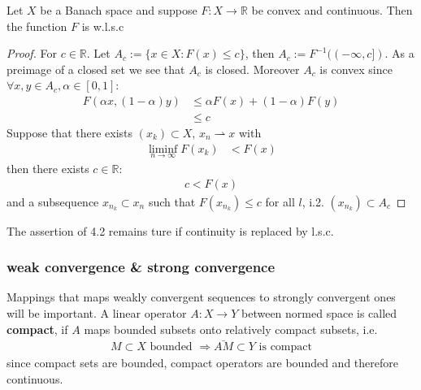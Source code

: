 \begin{theorem}
	Let $X$ be a Banach space and suppose $F: X \rightarrow \mathbb{R}$ be convex and continuous. Then the function $F$ is w.l.s.c
\end{theorem}
\begin{proof}
	For $c \in \mathbb{R}$. Let $A_c:= \{x \in X: F(x) \le c\}$, then $A_c:= F^{-1}((-\infty, c])$. As a preimage of a closed set we see that $A_c$ is closed. Moreover $A_c$ is convex since $\forall x, y \in A_c, \alpha \in [0, 1]:$
	\begin{align*}
		F(\alpha x, (1 - \alpha)y ) &\le \alpha F(x) + (1 - \alpha)F(y)\\
		&\le c
	\end{align*}
	Suppose that there exists $(x_k) \subset X$, $x_n \rightharpoonup x$ with 
	\begin{align*}
		\liminf_{n \rightarrow \infty} F(x_k) &< F(x)
	\end{align*}
	then there exists $c \in \mathbb{R}:$
	\begin{align*}
		c < F(x)
	\end{align*}
	and a subsequence $x_{n_k} \subset x_n$ such that
	$F(x_{n_k}) \le c$ for all $l$, i.2. $(x_{n_k}) \subset A_c$
\end{proof}
\begin{remark}
The assertion of 4.2 remains ture if continuity is replaced by l.s.c. 	
\end{remark}


\subsubsection*{weak convergence \& strong convergence}
Mappings that maps weakly convergent sequences to strongly convergent ones will be important. A linear operator $A: X \rightarrow Y$ between normed space is called \textbf{compact}, if $A$ maps bounded subsets onto relatively compact subsets, i.e.
\begin{align*}
	M \subset X \text{ bounded } \Rightarrow \bar{AM} \subset Y \text{ is compact}
\end{align*}
since compact sets are bounded, compact operators are bounded and therefore continuous. 


